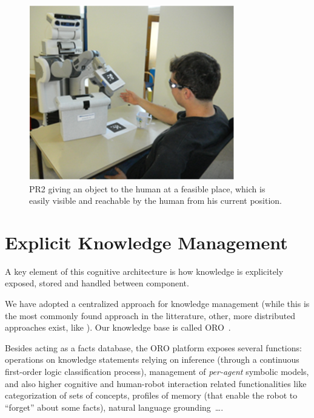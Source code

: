 \documentclass{svmult}
\begin{document}
\begin{figure}
  \centering
  \includegraphics[width=0.8\textwidth]{./figs/mightabilities/5.png}
  \caption { 
PR2 giving an object to the human at a feasible place, which is easily visible
and reachable by the human from his current position.
}
  \label{fig|pr2-giving}
\end{figure}





\section{Explicit Knowledge Management}
\label{cognitivekernel}

A key element of this cognitive architecture is how knowledge is explicitely
exposed, stored and handled between component.

We have adopted a centralized approach for knowledge management (while this is
the most commonly found approach in the litterature, other, more distributed
approaches exist, like \cite{Jacobsson2008}). Our knowledge base is called
ORO~\cite{Lemaignan2010}.


Besides acting as a facts database, the ORO platform exposes several functions:
operations on knowledge statements relying on inference (through a continuous
first-order logic classification process), management of \emph{per-agent}
symbolic models, and also higher cognitive and human-robot interaction related
functionalities like categorization of sets of concepts, profiles of memory
(that enable the robot to ``forget'' about some facts), natural language
grounding~\cite{Lemaignan2011}\ldots.
\end{document}
